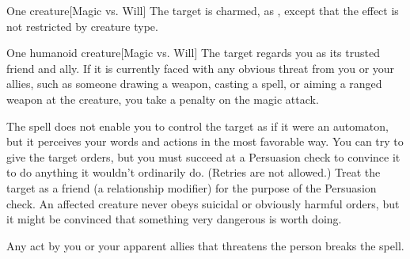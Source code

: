\begin{spellheader}
    \spellrng{\rngmed}
    \spelldur{\durlong}
\end{spellheader}
\begin{spelleffects}
    \begin{spelltarget}{One creature}[Magic vs. Will]
        \spellsuccess The target is charmed, as , except that the effect is not restricted by creature type.
    \end{spelltarget}
\end{spelleffects}
\begin{spellfooter}
    
\end{spellfooter}

\begin{spellheader}
    \spellrng{\rngmed}
    \spelldur{\durlong}
\end{spellheader}
\begin{spelleffects}
    \begin{spelltarget}{One humanoid creature}[Magic vs. Will]
        \spellsuccess The target regards you as its trusted friend and ally. If it is currently faced with any obvious threat from you or your allies, such as someone drawing a weapon, casting a spell, or aiming a ranged weapon at the creature, you take a  penalty on the magic attack.
        \par The spell does not enable you to control the target as if it were an automaton, but it perceives your words and actions in the most favorable way. You can try to give the target orders, but you must succeed at a Persuasion check to convince it to do anything it wouldn't ordinarily do. (Retries are not allowed.) Treat the target as a friend (a  relationship modifier) for the purpose of the Persuasion check. An affected creature never obeys suicidal or obviously harmful orders, but it might be convinced that something very dangerous is worth doing.
    \end{spelltarget}
\end{spelleffects}
\begin{spellfooter}
    \spellnotes Any act by you or your apparent allies that threatens the  person breaks the spell.

    \norepeatspellnotes
\end{spellfooter}

